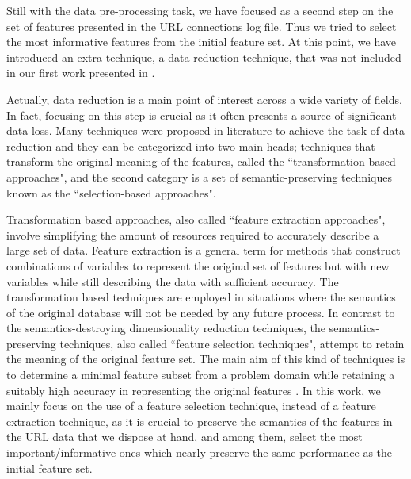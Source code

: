 \documentclass{llncs}
\begin{document}
Still with the data pre-processing task, we have focused as a second step on the set of features presented in the URL connections log file. Thus we tried to select the most informative features from the initial feature set. At this point, we have introduced an extra technique, a data reduction technique, that was not included in our first work presented in \cite{ECTA}. 

Actually, data reduction is a main point of interest across a wide variety of fields. In fact, focusing on this step is crucial as it often presents a source of significant data loss. Many techniques were proposed in literature to achieve the task of data reduction and they can be categorized into two main heads; techniques that transform the original meaning of the features, called the ``transformation-based approaches", and the second category is a set of semantic-preserving techniques known as the ``selection-based approaches".

Transformation based approaches, also called ``feature extraction approaches", involve simplifying the amount of resources required to accurately describe a large set of data. Feature extraction is a general term for methods that construct combinations of variables to represent the original set of features but with new variables while still describing the data with sufficient accuracy. The transformation based techniques are employed in situations where the semantics of the original database will not be needed by any future process. In contrast to the semantics-destroying dimensionality reduction techniques, the semantics-preserving techniques, also called ``feature selection techniques", attempt to retain the meaning of the original feature set. The main aim of this kind of techniques is to determine a minimal feature subset from a problem domain while retaining a suitably high accuracy in representing the original features \cite{liu1998feature}. In this work, we mainly focus on the use of a feature selection technique, instead of a feature extraction technique, as it is crucial to preserve the semantics of the features in the URL data that we dispose at hand, and among them, select the most important/informative ones which nearly preserve  the same performance as the initial feature set.
\end{document}
